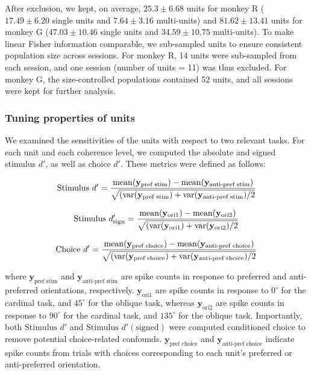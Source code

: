 \documentclass[lineno,pdflatex,sn-basic]{sn-jnl}%
\theoremstyle{thmstyleone}%
\theoremstyle{thmstyletwo}%
\theoremstyle{thmstylethree}%
\begin{document}
After exclusion, we kept, on average, $25.3\pm6.68$ units for monkey R ($17.49 \pm 6.20$ single units and  $7.64 \pm 3.16$ multi-units) and $81.62\pm13.41$ units for monkey G ($47.03 \pm 10.46$ single units and $34.59 \pm 10.75$ multi-units). To make linear Fisher information comparable, we sub-sampled units to ensure consistent population size across sessions. For monkey R, 14 units were sub-sampled from each session, and one session (number of units = 11) was thus excluded. For monkey G, the size-controlled populations contained 52 units, and all sessions were kept for further analysis.

\subsubsection{Tuning properties of units} \label{sec_ch2:tuning_properties_def}
We examined the sensitivities of the units with respect to two relevant tasks.  For each unit and each coherence level, we computed the absolute and signed stimulus $d'$, as well as choice $d'$. These metrics were defined as follows:

\[\textrm{Stimulus } d' = \frac{\rm{mean}(\mathbf{y}_\textrm{pref stim}) - \rm{mean}(\mathbf{y}_\textrm{anti-pref stim})}{\sqrt{(\rm{var}(\mathbf{y}_\textrm{pref stim}) + \rm{var}(\mathbf{y}_\textrm{anti-pref stim})/2}}\]

\[\textrm{Stimulus } d'_{\textrm{sign}} = \frac{\rm{mean}(\mathbf{y}_\textrm{ori1}) - \rm{mean}(\mathbf{y}_\textrm{ori2})}{\sqrt{(\rm{var}(\mathbf{y}_\textrm{ori1}) + \rm{var}(\mathbf{y}_\textrm{ori2})/2}}\]

\[\textrm{Choice } d' = \frac{\rm{mean}(\mathbf{y}_\textrm{pref choice}) - \rm{mean}(\mathbf{y}_\textrm{anti-pref choice})}{\sqrt{(\rm{var}(\mathbf{y}_\textrm{pref choice}) + \rm{var}(\mathbf{y}_\textrm{anti-pref choice})/2}}\]

where $\mathbf{y}_\textrm{pref stim}$ and $\mathbf{y}_\textrm{anti-pref stim}$ are spike counts in response to preferred and anti-preferred orientations, respectively. $\mathbf{y}_\textrm{ori1}$ are spike counts in response to $0^\circ$ for the cardinal task, and $45^\circ$ for the oblique task, whereas $\mathbf{y}_\textrm{ori2}$ are spike counts in response to $90^\circ$ for the cardinal task, and $135^\circ$ for the oblique task. Importantly, both $\textrm{Stimulus } d'$ and $\textrm{Stimulus } d' (\textrm{signed})$ were computed conditioned choice to remove potential choice-related confounds.  $\mathbf{y}_\textrm{pref choice}$ and $\mathbf{y}_\textrm{anti-pref choice}$ indicate spike counts from trials with choices corresponding to each unit's preferred or anti-preferred orientation.
\end{document}
